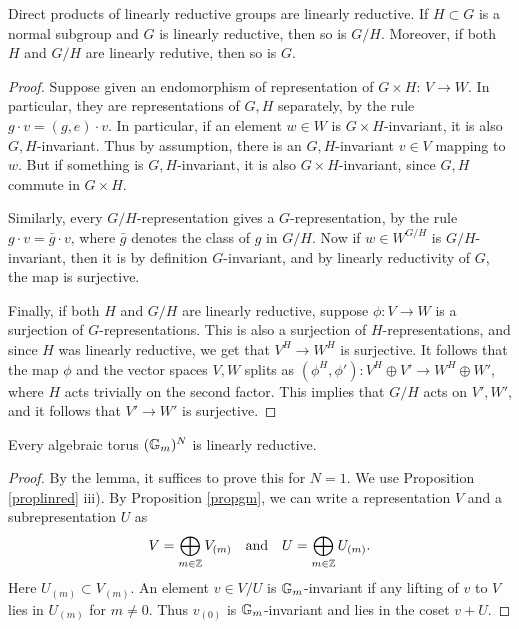 \documentclass[11pt, english]{article}
\begin{document}
\begin{lemma}
Direct products of linearly reductive groups are linearly reductive. If $H \subset G$ is a normal subgroup and $G$ is linearly reductive, then so is $G/H$. Moreover, if both $H$ and $G/H$ are linearly redutive, then so is $G$.
\end{lemma}
\begin{proof}
Suppose given an endomorphism of representation of $G \times H$: $V \to W$. In particular, they are representations of $G,H$ separately, by the rule $g \cdot v = (g,e) \cdot v$. In particular, if an element $w \in W$ is $G \times H$-invariant, it is also $G,H$-invariant. Thus by assumption, there is an $G,H$-invariant $v \in V$ mapping to $w$. But if something is $G,H$-invariant, it is also $G \times H$-invariant, since $G,H$ commute in $G \times H$.

Similarly, every $G/H$-representation gives a $G$-representation, by the rule $g \cdot v = \bar g \cdot v$, where $\bar g$ denotes the class of $g$ in $G/H$. Now if $w \in W^{G/H}$ is $G/H$-invariant, then it is by definition $G$-invariant, and by linearly reductivity of $G$, the map is surjective.

Finally, if both $H$ and $G/H$ are linearly reductive, suppose $\phi:V \to W$ is a surjection of $G$-representations. This is also a surjection of $H$-representations, and since $H$ was linearly reductive, we get that $V^H \to W^H$ is surjective. It follows that the map $\phi$ and the vector spaces $V,W$ splits as $(\phi^H,\phi'):V^H \oplus V' \to W^H \oplus W'$, where $H$ acts trivially on the second factor. This implies that $G/H$ acts on $V',W'$, and it follows that $V' \to W'$ is surjective.
\end{proof}

\begin{prop}
Every algebraic torus $(\mathbb{G}_m)^N$ is linearly reductive.
\end{prop}
\begin{proof}
By the lemma, it suffices to prove this for $N=1$. We use Proposition \ref{proplinred} iii). By Proposition \ref{propgm}, we can write a representation $V$ and a subrepresentation $U$ as
\begin{align*}
V = \bigoplus_{m \in \mathbb{Z}} V_{(m)} & &\text{and}& & U = \bigoplus_{m \in \mathbb{Z}} U_{(m)}.
\end{align*}
Here $U_{(m)} \subset V_{(m)}$. An element $v \in V/U$ is $\mathbb{G}_m$-invariant if any lifting of $v$ to $V$ lies in $U_{(m)}$ for $m \neq 0$. Thus $v_{(0)}$ is $\mathbb{G}_m$-invariant and lies in the coset $v+U$.
\end{proof}
\end{document}
